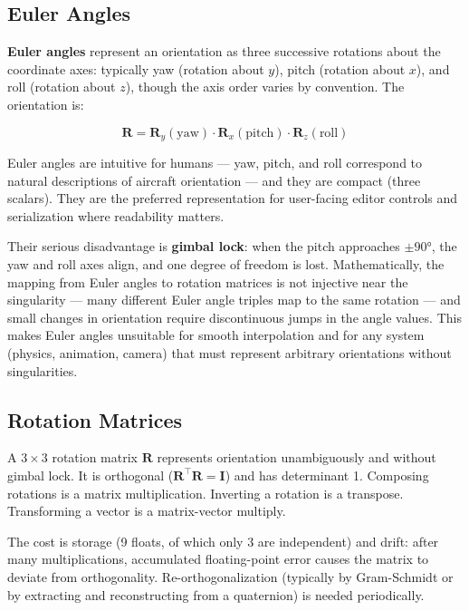 \documentclass[
  11pt,
  letterpaper,
  DIV=11,
  numbers=noendperiod,
  twoside,
  open=right]{scrreprt}
\begin{document}
\subsection{Euler Angles}\label{euler-angles}

\textbf{Euler angles} represent an orientation as three successive
rotations about the coordinate axes: typically yaw (rotation about
\(y\)), pitch (rotation about \(x\)), and roll (rotation about \(z\)),
though the axis order varies by convention. The orientation is:

\[
\mathbf{R} = \mathbf{R}_y(\text{yaw}) \cdot \mathbf{R}_x(\text{pitch}) \cdot \mathbf{R}_z(\text{roll})
\]

Euler angles are intuitive for humans --- yaw, pitch, and roll
correspond to natural descriptions of aircraft orientation --- and they
are compact (three scalars). They are the preferred representation for
user-facing editor controls and serialization where readability matters.

Their serious disadvantage is \textbf{gimbal lock}: when the pitch
approaches \(\pm 90°\), the yaw and roll axes align, and one degree of
freedom is lost. Mathematically, the mapping from Euler angles to
rotation matrices is not injective near the singularity --- many
different Euler angle triples map to the same rotation --- and small
changes in orientation require discontinuous jumps in the angle values.
This makes Euler angles unsuitable for smooth interpolation and for any
system (physics, animation, camera) that must represent arbitrary
orientations without singularities.

\subsection{Rotation Matrices}\label{rotation-matrices}

A \(3 \times 3\) rotation matrix \(\mathbf{R}\) represents orientation
unambiguously and without gimbal lock. It is orthogonal
(\(\mathbf{R}^\top \mathbf{R} = \mathbf{I}\)) and has determinant 1.
Composing rotations is a matrix multiplication. Inverting a rotation is
a transpose. Transforming a vector is a matrix-vector multiply.

The cost is storage (9 floats, of which only 3 are independent) and
drift: after many multiplications, accumulated floating-point error
causes the matrix to deviate from orthogonality. Re-orthogonalization
(typically by Gram-Schmidt or by extracting and reconstructing from a
quaternion) is needed periodically.
\end{document}
